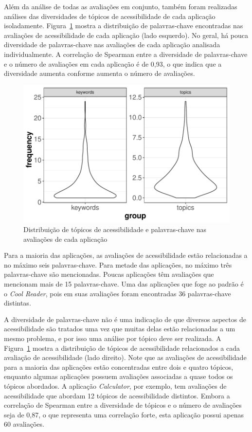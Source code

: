 Além da análise de todas as avaliações em conjunto, também foram realizadas análises das diversidades de tópicos de acessibilidade de cada aplicação isoladamente. 
Figura~\ref{fig:distributiontopicsapps} mostra a distribuição de palavras-chave encontradas nas avaliações de acessibilidade de cada aplicação (lado esquerdo). 
No geral, há pouca diversidade de palavras-chave nas avaliações de cada aplicação analisada individualmente. 
A correlação de Spearman entre a diversidade de palavras-chave e o número de avaliações em cada aplicação é de 0,93, o que indica que a diversidade aumenta conforme aumenta o número de avaliações.


\begin{figure}[!htb]
\centering
\includegraphics[scale=0.8]{imagens/distribution-topics-keywords.pdf}
\caption{Distribuição de tópicos de acessibilidade e palavras-chave nas avaliações de cada aplicação}
\label{fig:distributiontopicsapps}
\end{figure}


Para a maioria das aplicações, as avaliações de acessibilidade estão relacionadas a no máximo seis palavras-chave. 
Para metade das aplicações, no máximo três palavras-chave são mencionadas. 
Poucas aplicações têm avaliações que mencionam mais de 15 palavras-chave. 
Uma das aplicações que foge ao padrão é o \textit{Cool Reader}, pois em suas avaliações foram encontradas 36 palavras-chave distintas. 


A diversidade de palavras-chave não é uma indicação de que diversos aspectos de acessibilidade são tratados uma vez que muitas delas estão relacionadas a um mesmo problema, e por isso uma análise por tópico deve ser realizada. 
A Figura~\ref{fig:distributiontopicsapps} mostra a distribuição de tópicos de acessibilidade relacionados a cada avaliação de acessibilidade (lado direito). 
Note que as avaliações de acessibilidade para a maioria das aplicações estão concentradas entre dois e quatro tópicos, enquanto algumas aplicações possuem avaliações associadas a quase todos os tópicos abordados. 
A aplicação \textit{Calculator}, por exemplo, tem avaliações de acessibilidade que abordam 12 tópicos de acessibilidade distintos. 
Embora a correlação de Spearman entre a diversidade de tópicos e o número de avaliações seja de 0,87, o que representa uma correlação forte, esta aplicação possui apenas 60 avaliações. \newline


